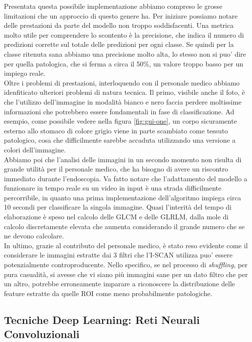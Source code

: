 Presentata questa possibile implementazione abbiamo compreso le grosse
limitazioni che un approccio di questo genere ha.
Per iniziare possiamo notare delle prestazioni da parte del modello non
troppo soddisfacenti.
Una metrica molto utile per comprendere lo scontento è la precisione,
che indica il numero di predizioni corrette sul totale delle predizioni per ogni
classe.
Se quindi per la classe ritenuta sana abbiamo una precisione molto alta, lo stesso
non si puo' dire per quella patologica, che si ferma a circa il 50\%, un valore
troppo basso per un impiego reale.\\
Oltre i problemi di prestazioni, interloquendo con il personale medico
abbiamo idenfiticato ulteriori problemi di natura tecnica.
Il primo, visibile anche il foto, è che l'utilizzo dell'immagine in modalità
bianco e nero faccia perdere moltissime informazioni che potrebbero essere
fondamentali in fase di classificazione.
Ad esempio, come possibile vedere nella figura \ref{fig:gui-one}, un corpo
sicuramente esterno allo stomaco di colore grigio viene in parte
scambiato come tessuto patologico, cosa che difficilmente sarebbe accaduta
utilizzando una versione a colori dell'immagine.\\
Abbiamo poi che l'analisi delle immagini in un secondo momento non risulta
di grande utilità per il personale medico, che ha bisogno di avere un 
riscontro immediato durante l'endoscopia.
Va fatto notare che l'adattamento del modello a funzionare in tempo reale
su un video in input è una strada difficilmente percorribile, in quanto
una prima implementazione dell'algoritmo impiega circa 10 secondi per classificare
la singola immagine.
Quasi l'interità del tempo di elaborazione è speso nel calcolo delle
GLCM e delle GLRLM, dalla mole di calcolo discretamente elevata che aumenta
considerando il grande numero che se ne devono calcolare. \\

In ultimo, grazie al contributo del personale medico, è stato reso evidente
come il considerare le immagini estratte dai 3 filtri che l'I-SCAN utilizza
puo' essere potenzialmente controproducente.
Nello specifico, se nel processo di {\it shuffling}, per pura casualità,
si avesse che vi siano più immagini sane per un dato filtro che per un altro,
potrebbe erroneamente imparare a riconoscere la distribuzione delle
feature estratte da quelle ROI come meno probabilmente patologiche.

\subsection{\label{sec:deep-learning}Tecniche Deep Learning: Reti Neurali Convoluzionali}

